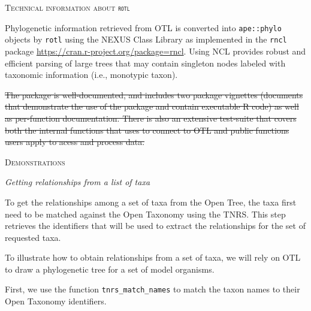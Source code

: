 \documentclass[12pt,letterpaper]{article}\usepackage[]{graphicx}\usepackage[]{color}
\renewcommand{\section}[1]{%
\bigskip
\begin{center}
\begin{Large}
\normalfont\scshape #1
\medskip
\end{Large}
\end{center}}
\renewcommand{\subsection}[1]{%
\bigskip
\begin{center}
\begin{large}
\normalfont\itshape #1
\end{large}
\end{center}}
\providecommand{\DIFdeltex}[1]{{\protect\color{red}\sout{#1}}}                      %
\providecommand{\DIFdelbegin}{} %
\providecommand{\DIFdelend}{} %
\providecommand{\DIFdel}[1]{\texorpdfstring{\DIFdeltex{#1}}{}} %
\begin{document}

\section{Technical information about \texttt{rotl}}

Phylogenetic information retrieved from OTL is converted into
\texttt{ape::phylo} objects by \texttt{rotl} using the NEXUS Class Library
\citep[NCL,][]{Lewis2003} as implemented in the \texttt{rncl} package
\url{https://cran.r-project.org/package=rncl}. Using NCL provides robust and
efficient parsing of large trees that may contain singleton nodes labeled with
taxonomic information (i.e., monotypic taxon).

\DIFdelbegin \DIFdel{The package is well-documented, and includes two package
vignettes (documents that demonstrate the use of the package and contain executable 
R code) as well as per-function documentation. There is also an extensive
test-suite that covers both the internal functions that \textt{rotl} uses to
connect to OTL and public functions users apply to acess and process data. 
}%

\DIFdelend \section{Demonstrations}
\label{sec:demonstrations}

\subsection{Getting relationships from a list of taxa}
\label{sec:get-relationships}

To get the relationships among a set of taxa from the Open Tree, the taxa first
need to be matched against the Open Taxonomy using the TNRS. This step retrieves
the identifiers that will be used to extract the relationships for the set of
requested taxa.

To illustrate how to obtain relationships from a set of taxa, we will rely on
OTL to draw a phylogenetic tree for a set of model organisms.



First, we use the function \texttt{tnrs\_match\_names} to match the taxon names to
their Open Taxonomy identifiers.
\end{document}
